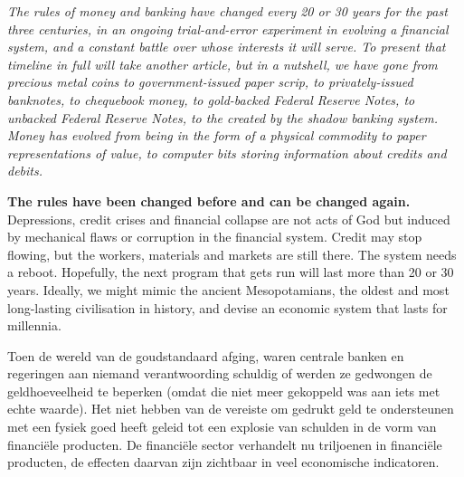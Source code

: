     \begin{tcolorbox}
    [enhanced,
    title=Banking system,
    frame style=
    {left color=orange!85!black,right color=yellow!95!black}]

         \itshape{The rules of money and banking have changed every 20 or 30 years for the past three centuries, in an ongoing trial-and-error experiment in evolving a financial system, and a constant battle over whose interests it will serve. To present that timeline in full will take another article, but in a nutshell, we have gone from precious metal coins to government-issued paper scrip, to privately-issued banknotes, to chequebook money, to gold-backed Federal Reserve Notes, to unbacked Federal Reserve Notes, to the  created by the shadow banking system. Money has evolved from being  in the form of a physical commodity to paper representations of value, to computer bits storing information about credits and debits.}
        
        \tcblower
        
        \textbf{The rules have been changed before and can be changed again.} Depressions, credit crises and financial collapse are not acts of God but induced by mechanical flaws or corruption in the financial system. Credit may stop flowing, but the workers, materials and markets are still there. The system needs a reboot. Hopefully, the next program that gets run will last more than 20 or 30 years. Ideally, we might mimic the ancient Mesopotamians, the oldest and most long-lasting civilisation in history, and devise an economic system that lasts for millennia.\cite{EllenBrown}

\end{tcolorbox}

\medskip

\noindent Toen de wereld van de goudstandaard afging, waren centrale banken en regeringen aan niemand verantwoording schuldig of werden ze gedwongen de geldhoeveelheid te beperken (omdat die niet meer gekoppeld was aan iets met echte waarde). Het niet hebben van de vereiste om gedrukt geld te ondersteunen met een fysiek goed heeft geleid tot een explosie van schulden in de vorm van financi\"ele producten. De financiële sector verhandelt nu triljoenen in financiële producten, de effecten daarvan zijn zichtbaar in veel economische indicatoren.\medskip


